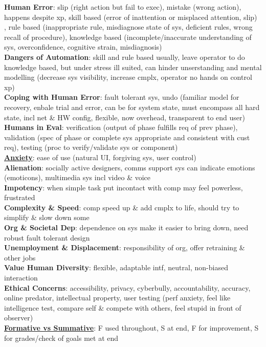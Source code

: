 \documentclass[a4paper]{article}
\begin{document}
\begin{multicols}{3}
        \textbf{Human Error}: slip (right action but fail to exec), mistake (wrong action), happens despite xp, skill based (error of inattention or misplaced attention, slip)\\, rule based (inappropriate rule, misdiagnose state of sys, deficient rules, wrong recall of procedure), knowledge based (incomplete/inaccurate understanding of sys, overconfidence, cognitive strain, misdiagnosis)\\
        \textbf{Dangers of Automation}: skill and rule based usually, leave operator to do knowledge based, but under stress ill suited, can hinder unserstanding and mental modelling (decrease sys visibility, increase cmplx, operator no hands on control xp)\\
        \textbf{Coping with Human Error}: fault tolerant sys, undo (familiar model for recovery, enbale trial and error, can be for system state, must encompass all hard state, incl net \& HW config, flexible, now overhead, transparent to end user)\\
        \textbf{Humans in Eval}: verification (output of phase fulfills req of prev phase), validation (spec of phase or complete sys appropriate and consistent with cust req), testing (proc to verify/validate sys or component)\\
        \underline{\textbf{Anxiety}}: ease of use (natural UI, forgiving sys, user control)\\
        \textbf{Alienation}: socially active designers, comms support sys can indicate emotions (emoticons), multimedia sys incl video \& voice\\
        \textbf{Impotency}: when simple task put incontact with comp may feel powerless, frustrated\\
        \textbf{Complexity \& Speed}: comp speed up \& add cmplx to life, should try to simplify \& slow down some\\
        \textbf{Org \& Societal Dep}: dependence on sys make it easier to bring down, need robust fault tolerant design\\
        \textbf{Unemployment \& Displacement}: responsibility of org, offer retraining \& other jobs\\
        \textbf{Value Human Diversity}: flexible, adaptable intf, neutral, non-biased interaction\\
        \textbf{Ethical Concerns}: accessibility, privacy, cyberbully, accountability, accuracy, online predator, intellectual property, user testing (perf anxiety, feel like intelligence test, compare self \& compete with others, feel stupid in front of observer)\\
        \underline{\textbf{Formative vs Summative}}: F used throughout, S at end, F for improvement, S for grades/check of goals met at end\\
    \end{multicols}
    
\end{document}
